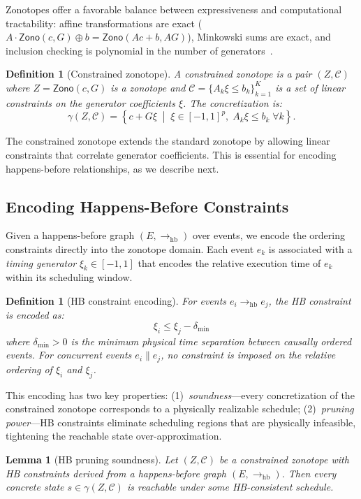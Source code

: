 \documentclass[11pt]{article}
\newtheorem{lemma}[theorem]{Lemma}
\newtheorem{definition}[theorem]{Definition}
\newcommand{\calC}{\mathcal{C}}
\newcommand{\hb}{\rightarrow_{\mathrm{hb}}}
\newcommand{\conc}{\parallel}
\newcommand{\zo}{\mathsf{Zono}}
\begin{document}
Zonotopes offer a favorable balance between expressiveness and computational
tractability: affine transformations are exact ($A \cdot \zo(c, G) \oplus b
= \zo(Ac + b, AG)$), Minkowski sums are exact, and inclusion checking
is polynomial in the number of generators~\cite{kopetzki2017methods,
singh2018fast}.

\begin{definition}[Constrained zonotope]
\label{def:constrained-zono}
A \emph{constrained zonotope} is a pair $(Z, \calC)$ where
$Z = \zo(c, G)$ is a zonotope and $\calC = \{A_k \xi \leq b_k\}_{k=1}^{K}$
is a set of linear constraints on the generator coefficients $\xi$.
The concretization is:
\[
  \gamma(Z, \calC) = \left\{ c + G\xi \;\middle|\;
  \xi \in [-1,1]^p,\; A_k \xi \leq b_k \;\forall k \right\}.
\]
\end{definition}

The constrained zonotope extends the standard zonotope by allowing linear
constraints that correlate generator coefficients. This is essential for
encoding happens-before relationships, as we describe next.

\subsection{Encoding Happens-Before Constraints}

Given a happens-before graph $(E, \hb)$ over events, we encode the ordering
constraints directly into the zonotope domain. Each event $e_k$ is
associated with a \emph{timing generator} $\xi_k \in [-1,1]$ that encodes
the relative execution time of $e_k$ within its scheduling window.

\begin{definition}[HB constraint encoding]
\label{def:hb-encoding}
For events $e_i \hb e_j$, the HB constraint is encoded as:
\[
  \xi_i \leq \xi_j - \delta_{\min}
\]
where $\delta_{\min} > 0$ is the minimum physical time separation between
causally ordered events. For concurrent events $e_i \conc e_j$, no
constraint is imposed on the relative ordering of $\xi_i$ and $\xi_j$.
\end{definition}

This encoding has two key properties:
(1)~\emph{soundness}---every concretization of the constrained zonotope
corresponds to a physically realizable schedule;
(2)~\emph{pruning power}---HB constraints eliminate scheduling regions
that are physically infeasible, tightening the reachable state
over-approximation.

\begin{lemma}[HB pruning soundness]
\label{lem:hb-sound}
Let $(Z, \calC)$ be a constrained zonotope with HB constraints derived
from a happens-before graph $(E, \hb)$. Then every concrete state
$s \in \gamma(Z, \calC)$ is reachable under some HB-consistent schedule.
\end{lemma}
\end{document}
